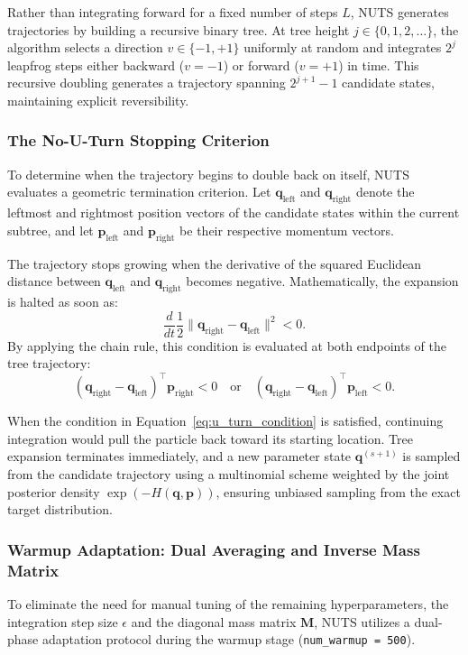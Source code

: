 \documentclass[12pt,oneside]{report}
\theoremstyle{definition}
\theoremstyle{remark}
\begin{document}
Rather than integrating forward for a fixed number of steps $L$, NUTS generates trajectories by building a recursive binary tree. At tree height $j \in \{0, 1, 2, \dots\}$, the algorithm selects a direction $v \in \{-1, +1\}$ uniformly at random and integrates $2^j$ leapfrog steps either backward ($v = -1$) or forward ($v = +1$) in time. This recursive doubling generates a trajectory spanning $2^{j+1}-1$ candidate states, maintaining explicit reversibility.

\subsubsection{The No-U-Turn Stopping Criterion}

To determine when the trajectory begins to double back on itself, NUTS evaluates a geometric termination criterion. Let $\mathbf{q}_{\text{left}}$ and $\mathbf{q}_{\text{right}}$ denote the leftmost and rightmost position vectors of the candidate states within the current subtree, and let $\mathbf{p}_{\text{left}}$ and $\mathbf{p}_{\text{right}}$ be their respective momentum vectors. 

The trajectory stops growing when the derivative of the squared Euclidean distance between $\mathbf{q}_{\text{left}}$ and $\mathbf{q}_{\text{right}}$ becomes negative. Mathematically, the expansion is halted as soon as:
\begin{equation}
    \frac{d}{dt} \frac{1}{2} \|\mathbf{q}_{\text{right}} - \mathbf{q}_{\text{left}}\|^2 < 0.
\end{equation}
By applying the chain rule, this condition is evaluated at both endpoints of the tree trajectory:
\begin{equation}
    (\mathbf{q}_{\text{right}} - \mathbf{q}_{\text{left}})^\top \mathbf{p}_{\text{right}} < 0 \quad \text{or} \quad (\mathbf{q}_{\text{right}} - \mathbf{q}_{\text{left}})^\top \mathbf{p}_{\text{left}} < 0.
    \label{eq:u_turn_condition}
\end{equation}

When the condition in Equation~\ref{eq:u_turn_condition} is satisfied, continuing integration would pull the particle back toward its starting location. Tree expansion terminates immediately, and a new parameter state $\mathbf{q}^{(s+1)}$ is sampled from the candidate trajectory using a multinomial scheme weighted by the joint posterior density $\exp(-H(\mathbf{q}, \mathbf{p}))$, ensuring unbiased sampling from the exact target distribution.

\subsubsection{Warmup Adaptation: Dual Averaging and Inverse Mass Matrix}
To eliminate the need for manual tuning of the remaining hyperparameters, the integration step size $\epsilon$ and the diagonal mass matrix $\mathbf{M}$, NUTS utilizes a dual-phase adaptation protocol during the warmup stage (\texttt{num\_warmup = 500}).
\end{document}
